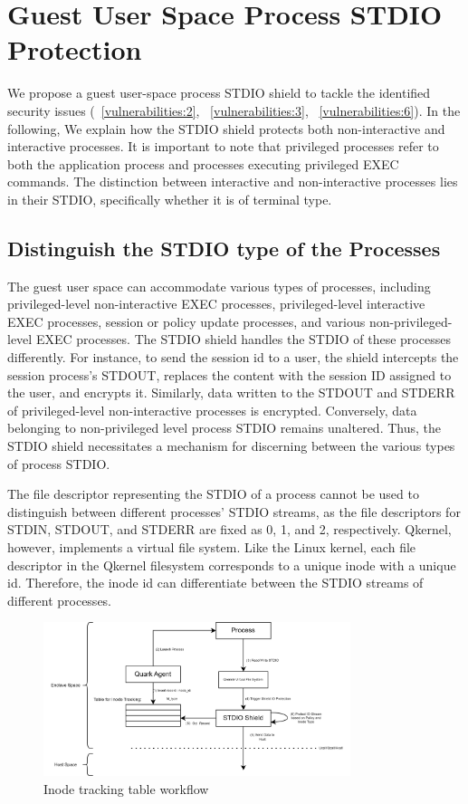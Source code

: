 \section{Guest User Space Process STDIO Protection}
\label{sec:design_STDIO_PROTECTION}
We propose a guest user-space process STDIO shield to tackle the identified security issues (~\ref{vulnerabilities:2}, ~\ref{vulnerabilities:3}, ~\ref{vulnerabilities:6}). In the following, We explain how the STDIO shield protects both non-interactive and interactive processes. It is important to note that privileged processes refer to 
both the application process and processes executing privileged EXEC commands. The distinction between interactive and non-interactive processes lies in their STDIO, specifically whether it is of terminal type. 


\subsection{Distinguish the STDIO type of the Processes}
\label{sec:design_Distinguish_io}

The guest user space can accommodate various types of processes, including privileged-level non-interactive EXEC processes, privileged-level interactive EXEC processes, session or policy update processes, and various non-privileged-level EXEC processes. The STDIO shield handles the STDIO of these processes differently. For instance, 
to send the session id to a user, the shield intercepts the session process's STDOUT, replaces the content with the session ID assigned to the user, and encrypts it. Similarly, data written to the STDOUT and STDERR of privileged-level non-interactive processes is encrypted. Conversely, data belonging 
to non-privileged level process STDIO remains unaltered. Thus, the STDIO shield necessitates a mechanism for discerning between the various types of process STDIO.
 
The file descriptor representing the STDIO of a process cannot be used to distinguish between different processes' STDIO streams, as the file descriptors for STDIN, STDOUT, and STDERR are fixed as 0, 1, and 2, respectively. Qkernel, however, implements a virtual file system. Like the Linux kernel, each file descriptor in the Qkernel filesystem corresponds to 
a unique inode with a unique id. Therefore, the inode id can differentiate between the STDIO streams of different processes.
\begin{figure}[!htb]
    \centering
    \includegraphics[width=0.8\textwidth]{images/differenciate_fds.png}
    \caption[Inode tracking table workflow]{Inode tracking table workflow}
    \label{fig:differenciate_fds}
\end{figure}
 
